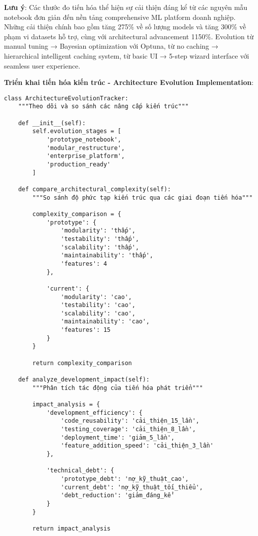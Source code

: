 \textbf{Lưu ý}: Các thước đo tiến hóa thể hiện sự cải thiện đáng kể từ các nguyên mẫu notebook đơn giản đến nền tảng comprehensive ML platform doanh nghiệp. Những cải thiện chính bao gồm tăng 275\% về số lượng models và tăng 300\% về phạm vi datasets hỗ trợ, cùng với architectural advancement 1150\%. Evolution từ manual tuning → Bayesian optimization với Optuna, từ no caching → hierarchical intelligent caching system, từ basic UI → 5-step wizard interface với seamless user experience.

\textbf{Triển khai tiến hóa kiến trúc - Architecture Evolution Implementation}:

\begin{verbatim}
class ArchitectureEvolutionTracker:
    """Theo dõi và so sánh các nâng cấp kiến trúc"""
    
    def __init__(self):
        self.evolution_stages = [
            'prototype_notebook',
            'modular_restructure', 
            'enterprise_platform',
            'production_ready'
        ]
    
    def compare_architectural_complexity(self):
        """So sánh độ phức tạp kiến trúc qua các giai đoạn tiến hóa"""
        
        complexity_comparison = {
            'prototype': {
                'modularity': 'thấp',
                'testability': 'thấp', 
                'scalability': 'thấp',
                'maintainability': 'thấp',
                'features': 4
            },
            
            'current': {
                'modularity': 'cao',
                'testability': 'cao',
                'scalability': 'cao', 
                'maintainability': 'cao',
                'features': 15
            }
        }
        
        return complexity_comparison
    
    def analyze_development_impact(self):
        """Phân tích tác động của tiến hóa phát triển"""
        
        impact_analysis = {
            'development_efficiency': {
                'code_reusability': 'cải_thiện_15_lần',
                'testing_coverage': 'cải_thiện_8_lần', 
                'deployment_time': 'giảm_5_lần',
                'feature_addition_speed': 'cải_thiện_3_lần'
            },
            
            'technical_debt': {
                'prototype_debt': 'nợ_kỹ_thuật_cao',
                'current_debt': 'nợ_kỹ_thuật_tối_thiểu',
                'debt_reduction': 'giảm_đáng_kể'
            }
        }
        
        return impact_analysis
\end{verbatim}

